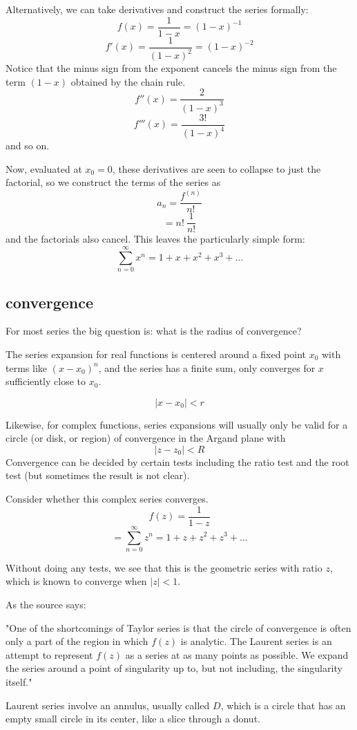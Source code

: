 \documentclass[11pt, oneside]{article}
\begin{document}
Alternatively, we can take derivatives and construct the series formally:
\[ f(x) = \frac{1}{1 - x} = (1-x)^{-1} \]
\[ f'(x) = \frac{1}{(1 - x)^2} = (1-x)^{-2} \]
Notice that the minus sign from the exponent cancels the minus sign from the term $(1-x)$ obtained by the chain rule.  
\[ f''(x) = \frac{2}{(1 - x)^3} \]
\[ f'''(x) = \frac{3!}{(1 - x)^4} \]
and so on.

Now, evaluated at $x_0 = 0$, these derivatives are seen to collapse to just the factorial, so we construct the terms of the series as
\[ a_n = \frac{f^{(n)}}{n!} \]
\[ = n! \ \frac{1}{n!} \]
and the factorials also cancel.  This leaves the particularly simple form:
\[ \sum_{n=0}^{\infty} x^n = 1 + x + x^2 + x^3 + \dots \]

\subsection*{convergence}
For most series the big question is:  what is the radius of convergence?

The series expansion for real functions is centered around a fixed point $x_0$ with terms like $(x - x_0)^n$, and the series has a finite sum, only converges for $x$ sufficiently close to $x_0$.

\[ |x - x_0| < r \]

Likewise, for complex functions, series expansions will usually only be valid for a circle (or disk, or region) of convergence in the Argand plane with 
\[ | z - z_0 | < R \]
Convergence can be decided by certain tests including the ratio test and the root test (but sometimes the result is not clear).

Consider whether this complex series converges.  
\[ f(z) = \frac{1}{1 - z} \]
\[ =\sum_{n=0}^{\infty} z^n = 1 + z + z^2 + z^3 + \dots \]

Without doing any tests, we see that this is the geometric series with ratio $z$, which is known to converge when $|z| < 1$.

As the source says:  

"One of the shortcomings of Taylor series is that the circle of convergence is often only a part of the region in which $f(z)$ is analytic.  The Laurent series is an attempt to represent $f(z)$ as a series at as many points as possible. We expand the series around a point of singularity up to, but not including, the singularity itself."

Laurent series involve an annulus, usually called $D$, which is a circle that has an empty small circle in its center, like a slice through a donut.
\end{document}
